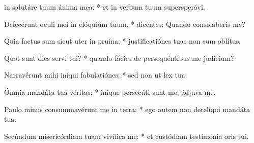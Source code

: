 \begin{psalmus}

 in salutáre tuum ánima mea: * et in verbum tuum supersperávi.

Defecérunt óculi mei in elóquium tuum, * dicéntes: Quando consoláberis me?

Quia factus sum sicut uter in pruína: * justificatiónes tuas non sum oblítus.

Quot sunt dies servi tui? * quando fácies de persequéntibus me judícium?

Narravérunt mihi iníqui fabulatiónes: * sed non ut lex tua.

Ómnia mandáta tua véritas: * iníque persecúti sunt me, ádjuva me.

Paulo minus consummavérunt me in terra: * ego autem non derelíqui mandáta tua.

Secúndum misericórdiam tuam vivífica me: * et custódiam testimónia oris tui.

\end{psalmus}
